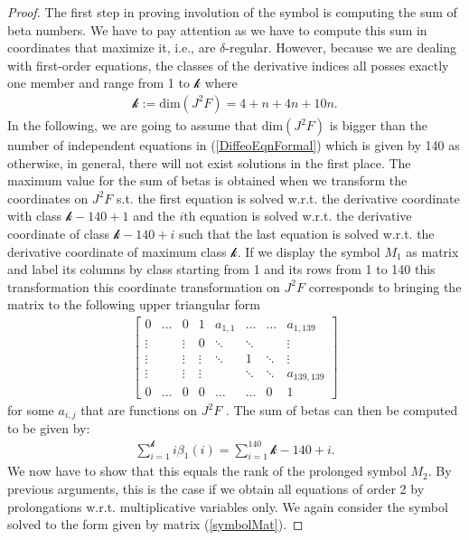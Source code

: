 \begin{proof}
The first step in proving involution of the symbol is computing the sum of beta numbers. We have to pay attention as we have to compute this sum in coordinates that maximize it, i.e., are $\delta$-regular. However, because we are dealing with first-order equations, the classes of the derivative indices all posses exactly one member and range from 1 to $\mathcal{k}$ where 
\begin{align}
    \mathcal{k} := \mathrm{dim}(J^2F) = 4+n+4n+10n.
\end{align}
In the following, we are going to assume that $\mathrm{dim}(J^2F)$ is bigger than the number of independent equations in (\ref{DiffeoEqnFormal}) which is given by 140 as otherwise, in general, there will not exist solutions in the first place. 
The maximum value for the sum of betas is obtained when we transform the coordinates on $J^2F$ s.t. the first equation is solved w.r.t. the derivative coordinate with class $\mathcal{k}-140+1$ and the $i$th equation is solved w.r.t. the derivative coordinate of class $\mathcal{k}-140+i$ such that the last equation is solved w.r.t. the derivative coordinate of maximum class $\mathcal{k}$. If we display the symbol $M_1$ as matrix and label its columns by class starting from 1 and its rows from 1 to 140 this transformation this coordinate transformation on $J^2F$ corresponds to bringing the matrix to the following upper triangular form
\begin{align}\label{symbolMat}
\begin{bmatrix} 
      0 & \hdots & 0 & 1 & a_{1,1} & \hdots & \hdots & a_{1,139} \\
      \vdots &  & \vdots & 0 & \ddots & \ddots & & \vdots  \\
      \vdots & & \vdots & \vdots & \ddots  & 1 & \ddots & \vdots  \\
      \vdots & & \vdots & \vdots & & \ddots & \ddots & a_{139,139} \\
      0 & \hdots & 0 & 0 & \hdots  & \hdots & 0 & 1
\end{bmatrix}
\end{align}
for some $a_{i,j}$ that are functions on $J^2F$ . The sum of betas can then be computed to be given by:
\begin{align}
    \sum_{i=1}^{\mathcal{k}} i \beta_1(i) = \sum_{i = 1}^{140} \mathcal{k} -140+i.
\end{align}
We now have to show that this equals the rank of the prolonged symbol $M_2$. By previous arguments, this is the case if we obtain all equations of order 2 by prolongations w.r.t. multiplicative variables only. We again consider the symbol solved to the form given by matrix (\ref{symbolMat}). 

\end{proof}
